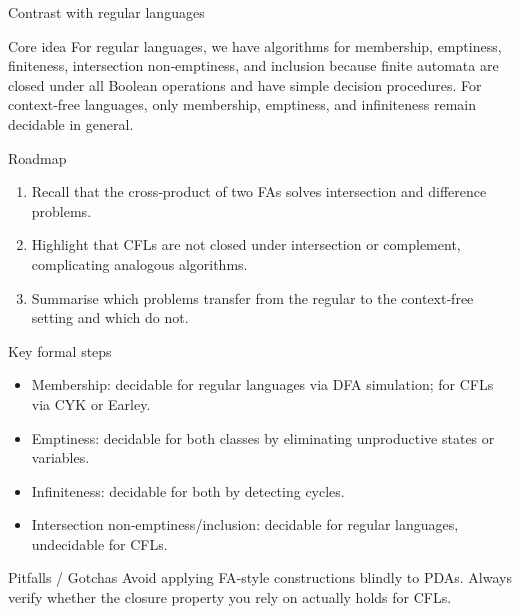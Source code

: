 \begin{frame}[t]{Contrast with regular languages}
  \begin{tblock}{Core idea}
    For regular languages, we have algorithms for membership,
    emptiness, finiteness, intersection non‑emptiness, and inclusion
    because finite automata are closed under all Boolean operations and
    have simple decision procedures.  For context‑free languages, only
    membership, emptiness, and infiniteness remain decidable in general.
  \end{tblock}
  \begin{tblock}{Roadmap}
    \begin{enumerate}
      \item Recall that the cross‑product of two FAs solves intersection
        and difference problems.
      \item Highlight that CFLs are not closed under intersection or
        complement, complicating analogous algorithms.
      \item Summarise which problems transfer from the regular to the
        context‑free setting and which do not.
    \end{enumerate}
  \end{tblock}
  \begin{tblock}{Key formal steps}
    \begin{itemize}
      \item Membership: decidable for regular languages via DFA
        simulation; for CFLs via CYK or Earley.
      \item Emptiness: decidable for both classes by eliminating
        unproductive states or variables.
      \item Infiniteness: decidable for both by detecting cycles.
      \item Intersection non‑emptiness/inclusion: decidable for regular
        languages, undecidable for CFLs.
    \end{itemize}
  \end{tblock}
  \begin{talert}{Pitfalls / Gotchas}
    Avoid applying FA‑style constructions blindly to PDAs.  Always
    verify whether the closure property you rely on actually holds for
    CFLs.
  \end{talert}
  \label{fr:6.3-09}
\end{frame}

